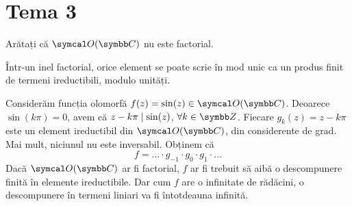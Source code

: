 \section*{Tema 3}

\setcounter{problem}{0}

\begin{problem}
Arătați că \(\ring(\complex)\) nu este factorial.
\end{problem}
\begin{solution}
Într-un inel factorial, orice element se poate scrie în mod unic ca un produs finit de termeni ireductibili, modulo unități.

Considerăm funcția olomorfă \(f (z) = \sin (z) \in \ring(\complex)\). Deoarece \(\sin (k \pi) = 0\), avem că \(z - k \pi \mid \sin (z)\), \(\forall k \in \integers\). Fiecare \(g_k (z) = z - k \pi\) este un element ireductibil din \(\ring(\complex)\), din considerente de grad. Mai mult, niciunul nu este inversabil. Obținem că
\[
    f = \hdots \cdot g_{-1} \cdot g_0 \cdot g_1 \cdot \hdots
\]
Dacă \(\ring(\complex)\) ar fi factorial, \(f\) ar fi trebuit să aibă o descompunere finită în elemente ireductibile. Dar cum \(f\) are o infinitate de rădăcini, o descompunere în termeni liniari va fi întotdeauna infinită.
\end{solution}

